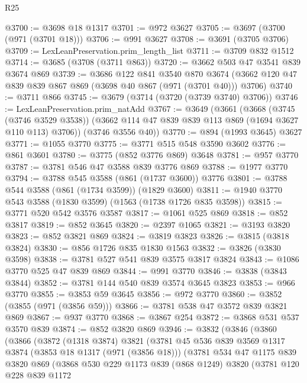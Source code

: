 \begin{lexlean}{R25}
\begin{coremodule}
@3700 := @3698 @18 @1317
@3701 := @972 @3627
@3705 := @3697 (@3700 (@971 (@3701 @18)))
@3706 := @991 @3627
@3708 := @3691 (@3705 @3706)
@3709 := LexLeanPreservation.prim_length_list
@3711 := @3709 @832 @1512
@3714 := @3685 (@3708 (@3711 @863))
@3720 := @3662 @503 @47 @3541 @839 @3674 @869
@3739 := @3686
    @122
    @841
    @3540
    @870
    @3674
    (@3662 @120 @47 @839 @839 @867 @869 (@3698 @40 @867 (@971 (@3701 @40))) @3706)
@3740 := @3711 @866
@3745 := @3679 (@3714 (@3720 (@3739 @3740) @3706))
@3746 := LexLeanPreservation.prim_natAdd
@3767 := @3649
    (@3661
      (@3668
        (@3745 (@3746 @3529 @3538))
        (@3662 @114 @47 @839 @839 @113 @869 (@1694 @3627 @110 @113) @3706))
      (@3746 @3556 @40))
@3770 := @894 (@1993 @3645) @3627
@3771 := @1055 @3770
@3775 := @3771 @515 @548 @3590 @3602
@3776 := @861 @3601
@3780 := @3775 (@852 @3776 @869) @3648
@3781 := @957 @3770
@3787 := @3781 @546 @47 @3588 @839 @3776 @869
@3788 := @1977 @3770
@3794 := @3788 @545 @3588 (@861 (@1737 @3600)) @3776
@3801 := @3788 @544 @3588 (@861 (@1734 @3599)) (@1829 @3600)
@3811 := @1940 @3770 @543 @3588 (@1830 @3599) (@1563 (@1738 @1726 @835 @3598))
@3815 := @3771 @520 @542 @3576 @3587
@3817 := @1061 @525 @869
@3818 := @852 @3817
@3819 := @852 @3645
@3820 := @2397 @1065
@3821 := @3193 @3820
@3823 := @852 @3821 @869
@3824 := @3819 @3823
@3826 := @3815 (@3818 @3824)
@3830 := @856 @1726 @835 @1830 @1563
@3832 := @3826 (@3830 @3598)
@3838 := @3781 @527 @541 @839 @3575 @3817 @3824
@3843 := @1086 @3770 @525 @47 @839 @869
@3844 := @991 @3770
@3846 := @3838 (@3843 @3844)
@3852 := @3781 @144 @540 @839 @3574 @3645 @3823
@3853 := @966 @3770
@3855 := @3853 @59 @3645
@3856 := @972 @3770
@3860 := @3852 (@3855 (@971 (@3856 @59)))
@3866 := @3781 @538 @47 @3572 @839 @3821 @869
@3867 := @937 @3770
@3868 := @3867 @254
@3872 := @3868 @531 @537 @3570 @839
@3874 := @852 @3820 @869
@3946 := @3832
    (@3846
      (@3860
        (@3866
          (@3872
            (@1318 @3874)
            @3821
            (@3781
              @45
              @536
              @839
              @3569
              @1317
              @3874
              (@3853 @18 @1317 (@971 (@3856 @18)))
              (@3781
                @534
                @47
                @1175
                @839
                @3820
                @869
                (@3868
                  @530
                  @229
                  @1173
                  @839
                  (@868 @1249)
                  @3820
                  (@3781
                    @120
                    @228
                    @839
                    @1172

\end{coremodule}
\end{lexlean}
